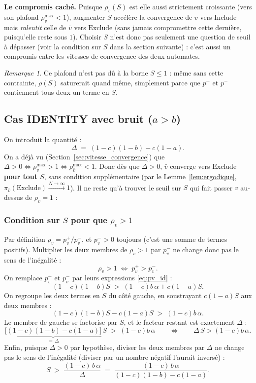 \documentclass[12pt,a4paper]{article}
\theoremstyle{remark}
\newtheorem{remark}{Remarque}[section]
\newcommand{\Inc}{\ensuremath{\mathrm{Include}}}
\newcommand{\Exc}{\ensuremath{\mathrm{Exclude}}}
\newcommand{\vbar}{\bar{v}}
\begin{document}
\textbf{Le compromis caché.} Puisque $\rho_{\vbar}(S)$ est elle aussi strictement
croissante (vers son plafond $\rho_{\vbar}^{\max}<1$), augmenter $S$ accélère la
convergence de $v$ vers \Inc{} mais \emph{ralentit} celle de $\vbar$ vers \Exc{} (sans
jamais compromettre cette dernière, puisqu'elle reste sous $1$). Choisir $S$ n'est donc
pas seulement une question de seuil à dépasser (voir la condition sur $S$ dans la
section suivante) : c'est aussi un compromis entre les vitesses de convergence des deux
automates.

\begin{remark}
Ce plafond n'est pas dû à la borne $S\le1$ : même sans cette contrainte, $\rho(S)$
saturerait quand même, simplement parce que $p^+$ et $p^-$ contiennent tous deux un
terme en $S$.
\end{remark}

\subsection{Cas IDENTITY avec bruit ($a > b$)}

On introduit la quantité :
\[
  \Delta \;=\; (1-c)(1-b) - c(1-a).
\]
On a déjà vu (Section~\ref{sec:vitesse_convergence}) que $\Delta>0 \iff
\rho_v^{\max}>1 \iff \rho_{\vbar}^{\max}<1$. Donc dès que $\Delta>0$, $\vbar$ converge
vers \Exc{} \textbf{pour tout $S$}, sans condition supplémentaire (par le
Lemme~\ref{lem:ergodique}, $\pi_{\vbar}(\Exc) \xrightarrow{N\to\infty} 1$). Il ne reste
qu'à trouver le seuil sur $S$ qui fait passer $v$ au-dessus de $\rho_v=1$ :

\subsubsection*{Condition sur $S$ pour que $\rho_v > 1$}

Par définition $\rho_v = p^+_v/p^-_v$, et $p^-_v>0$ toujours (c'est une somme de
termes positifs). Multiplier les deux membres de $\rho_v>1$ par $p^-_v$ ne change donc
pas le sens de l'inégalité :
\[
  \rho_v > 1 \;\Longleftrightarrow\; p^+_v > p^-_v.
\]
On remplace $p^+_v$ et $p^-_v$ par leurs expressions \eqref{eq:pv_id} :
\[
  (1-c)(1-b)S \;>\; (1-c)b\,\alpha + c(1-a)S.
\]
On regroupe les deux termes en $S$ du côté gauche, en soustrayant $c(1-a)S$ aux deux
membres :
\[
  (1-c)(1-b)S - c(1-a)S \;>\; (1-c)b\,\alpha.
\]
Le membre de gauche se factorise par $S$, et le facteur restant est exactement
$\Delta$ :
\[
  \underbrace{\bigl[(1-c)(1-b)-c(1-a)\bigr]}_{=\,\Delta}\,S \;>\; (1-c)b\,\alpha
  \qquad\Longleftrightarrow\qquad
  \Delta\,S > (1-c)b\,\alpha.
\]
Enfin, puisque $\Delta>0$ par hypothèse, diviser les deux membres par $\Delta$ ne
change pas le sens de l'inégalité (diviser par un nombre négatif l'aurait inversé) :
\[
  \boxed{S \;>\; \frac{(1-c)\,b\,\alpha}{\Delta}
         \;=\; \frac{(1-c)\,b\,\alpha}{(1-c)(1-b)-c(1-a)}.}
\]
\end{document}

